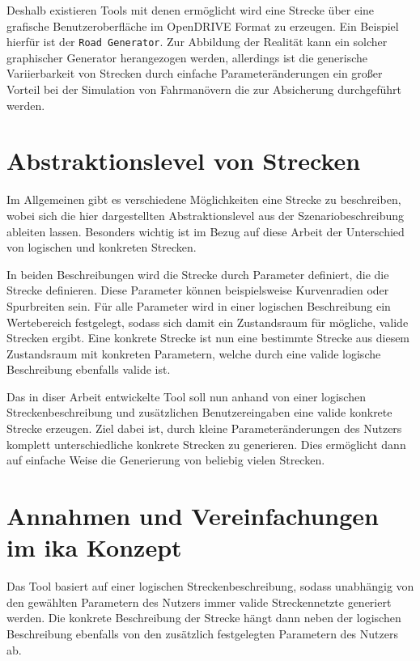 Deshalb existieren Tools mit denen ermöglicht wird eine Strecke über eine grafische Benutzeroberfläche im OpenDRIVE Format zu erzeugen. Ein Beispiel hierfür ist der \texttt{Road Generator}.\cite{RoadGenerator.2019} Zur Abbildung der Realität kann ein solcher graphischer Generator herangezogen werden, allerdings ist die generische Variierbarkeit von Strecken durch einfache Parameteränderungen ein großer Vorteil bei der Simulation von Fahrmanövern die zur Absicherung durchgeführt werden. 

\chapter{Abstraktionslevel von Strecken}

Im Allgemeinen gibt es verschiedene Möglichkeiten eine Strecke zu beschreiben, wobei sich die hier dargestellten Abstraktionslevel aus der Szenariobeschreibung ableiten lassen. Besonders wichtig ist im Bezug auf diese Arbeit der Unterschied von logischen und konkreten Strecken.

In beiden Beschreibungen wird die Strecke durch Parameter definiert, die die Strecke definieren. Diese Parameter können beispielsweise Kurvenradien oder Spurbreiten sein. Für alle Parameter wird in einer logischen Beschreibung ein Wertebereich festgelegt, sodass sich damit ein Zustandsraum für mögliche, valide Strecken ergibt. Eine konkrete Strecke ist nun eine bestimmte Strecke aus diesem Zustandsraum mit konkreten Parametern, welche durch eine valide logische Beschreibung ebenfalls valide ist.\cite{Szenarienbeschreibung.2019}

Das in diser Arbeit entwickelte Tool soll nun anhand von einer logischen Streckenbeschreibung und zusätzlichen Benutzereingaben eine valide konkrete Strecke erzeugen. Ziel dabei ist, durch kleine Parameteränderungen des Nutzers komplett unterschiedliche konkrete Strecken zu generieren. Dies ermöglicht dann auf einfache Weise die Generierung von beliebig vielen Strecken.

\chapter {Annahmen und Vereinfachungen im ika Konzept}

Das Tool basiert auf einer logischen Streckenbeschreibung, sodass unabhängig von den gewählten Parametern des Nutzers immer valide Streckennetzte generiert werden. Die konkrete Beschreibung der Strecke hängt dann neben der logischen Beschreibung ebenfalls von den zusätzlich festgelegten Parametern des Nutzers ab. 

